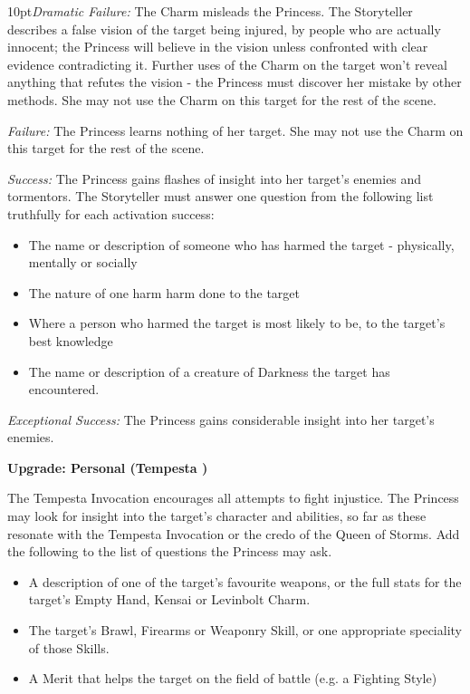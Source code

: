 \begin{myindentpar}{10pt}\emph{Dramatic Failure:} The Charm misleads the Princess. The Storyteller describes a false vision of the target being injured, by people who are actually innocent; the Princess will believe in the vision unless confronted with clear evidence contradicting it. Further uses of the Charm on the target won't reveal anything that refutes the vision - the Princess must discover her mistake by other methods. She may not use the Charm on this target for the rest of the scene.

\emph{Failure:} The Princess learns nothing of her target. She may not use the Charm on this target for the rest of the scene.

\emph{Success:} The Princess gains flashes of insight into her target's enemies and tormentors. The Storyteller must answer one question from the following list truthfully for each activation success:

\begin{itemize}
\item The name or description of someone who has harmed the target - physically, mentally or socially
\item The nature of one harm harm done to the target
\item Where a person who harmed the target is most likely to be, to the target's best knowledge
\item The name or description of a creature of Darkness the target has encountered.
\end{itemize}

\emph{Exceptional Success:} The Princess gains considerable insight into her target's enemies.

\textbf{Upgrade: Personal (Tempesta \textbullet\textbullet)}

The Tempesta Invocation encourages all attempts to fight injustice. The Princess may look for insight into the target's character and abilities, so far as these resonate with the Tempesta Invocation or the credo of the Queen of Storms. Add the following to the list of questions the Princess may ask.
\begin{itemize}
\item A description of one of the target's favourite weapons, or the full stats for the target's Empty Hand, Kensai or Levinbolt Charm. 
\item The target's Brawl, Firearms or Weaponry Skill, or one appropriate speciality of those Skills. 
\item A Merit that helps the target on the field of battle (e.g. a Fighting Style)\end{itemize}
\end{myindentpar}
                                         

